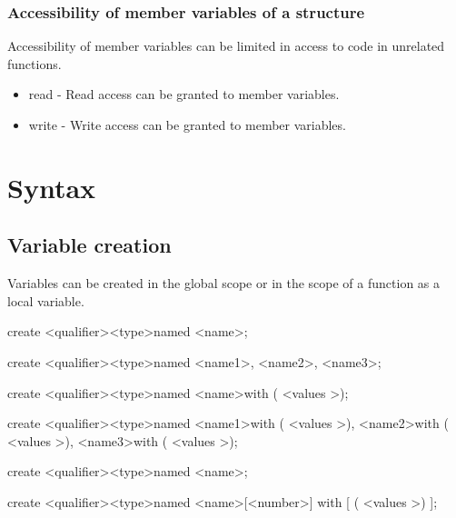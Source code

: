 \documentclass[12pt]{article}
\begin{document}
\subsubsection { Accessibility of member variables of a structure }

Accessibility of member variables can be limited in access to code in unrelated functions.
\begin{itemize}
\item read - Read access can be granted to member variables.
\item write - Write access can be granted to member variables.
\end{itemize}

\section {Syntax}

\subsection {Variable creation}

Variables can be created in the global scope or in the scope of a function as a local variable.

create \textless qualifier\textgreater  \space \textless type\textgreater \space named \textless name\textgreater;

create \textless qualifier\textgreater  \space \textless type\textgreater \space named \textless name1\textgreater , \textless name2\textgreater , \textless name3\textgreater;

create \textless qualifier\textgreater  \space \textless type\textgreater \space named \textless name\textgreater with ( \textless values \textgreater );

create \textless qualifier\textgreater  \space \textless type\textgreater \space named \textless name1\textgreater \space  with ( \textless values \textgreater ), \textless name2\textgreater \space  with ( \textless values \textgreater ), \textless name3\textgreater \space  with ( \textless values \textgreater );

create \textless qualifier\textgreater \space \textless type\textgreater \space [ ] named \textless name\textgreater;

create \textless qualifier\textgreater \space \textless type\textgreater \space [ ] named \textless name\textgreater [\textless number\textgreater] with [ ( \textless values \textgreater ) ];
\end{document}
